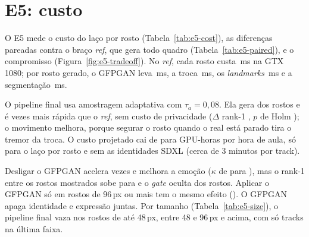 \begin{table}[ht]\centering
\caption{E3h: trocador de rosto, nativo e com P2 $\beta = 1{,}2$, nos rostos trocados; $\Delta$ pareado contra \texttt{inswapper} com P2, em todos os rostos.}
\label{tab:e3-swapper}

\fonteautor
\end{table}

\section{E5: custo}

O E5 mede o custo do laço por rosto (Tabela~\ref{tab:e5-cost}), as diferenças pareadas contra o braço \emph{ref}, que gera todo quadro (Tabela~\ref{tab:e5-paired}), e o compromisso (Figura~\ref{fig:e5-tradeoff}). No \emph{ref}, cada rosto custa \,ms na GTX 1080; por rosto gerado, o GFPGAN leva \,ms, a troca \,ms, os \emph{landmarks} \,ms e a segmentação \,ms.

O pipeline final usa amostragem adaptativa com $\tau_a = 0{,}08$. Ela gera  dos rostos e é  vezes mais rápida que o \emph{ref}, sem custo de privacidade ($\Delta$ rank-1 , $p$ de Holm ); o movimento melhora, porque segurar o rosto quando o real está parado tira o tremor da troca. O custo projetado cai de  para  GPU-horas por hora de aula, só para o laço por rosto e sem as identidades SDXL (cerca de 3 minutos por track).

Desligar o GFPGAN acelera  vezes e melhora a emoção ($\kappa$ de  para ), mas o rank-1 entre os rostos mostrados sobe para  e o \emph{gate} oculta  dos rostos. Aplicar o GFPGAN só em rostos de 96\,px ou mais tem o mesmo efeito (). O GFPGAN apaga identidade e expressão juntas. Por tamanho (Tabela~\ref{tab:e5-size}), o pipeline final vaza  nos rostos de até 48\,px,  entre 48 e 96\,px e  acima, com só  tracks na última faixa.

